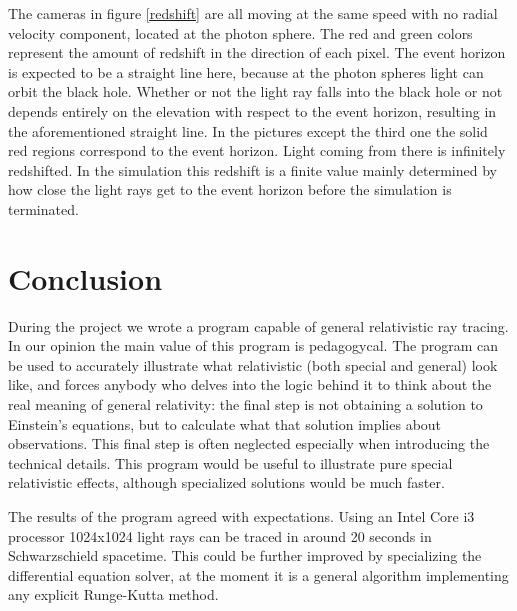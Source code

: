 \documentclass[pdftex,12pt,a4paper]{article}
\begin{document}
		The cameras in figure \ref{redshift} are all moving at the same speed with no radial velocity component, located at the photon sphere. The red and green colors represent the amount of redshift in the direction of each pixel. The event horizon is expected to be a straight line here, because at the photon spheres light can orbit the black hole. Whether or not the light ray falls into the black hole or not depends entirely on the elevation with respect to the event horizon, resulting in the aforementioned straight line. In the pictures except the third one the solid red regions correspond to the event horizon. Light coming from there is infinitely redshifted. In the simulation this redshift is a finite value mainly determined by how close the light rays get to the event horizon before the simulation is terminated.
	\section{Conclusion}
		During the project we wrote a program capable of general relativistic ray tracing. In our opinion the main value of this program is pedagogycal. The program can be used to accurately illustrate what relativistic (both special and general) look like, and forces anybody who delves into the logic behind it to think about the real meaning of general relativity: the final step is not obtaining a solution to Einstein's equations, but to calculate what that solution implies about observations. This final step is often neglected especially when introducing the technical details. This program would be useful to illustrate pure special relativistic effects, although specialized solutions would be much faster.
		
		The results of the program agreed with expectations. Using an Intel Core i3 processor 1024x1024 light rays can be traced in around 20 seconds in Schwarzschield spacetime. This could be further improved by specializing the differential equation solver, at the moment it is a general algorithm implementing any explicit Runge-Kutta method.
	
    
\end{document}
